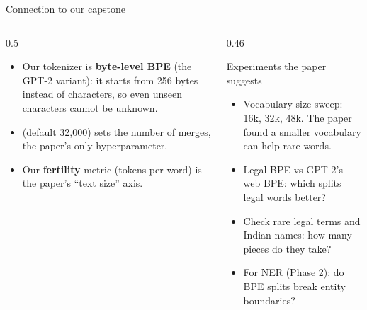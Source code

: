 \documentclass[aspectratio=169,11pt]{beamer}
\begin{document}
\begin{frame}{Connection to our capstone}
  \begin{columns}[T]
    \begin{column}{0.5\textwidth}
      \small
      \begin{itemize}
        \item Our tokenizer is \textbf{byte-level BPE} (the GPT-2 variant): it starts from 256 bytes instead of characters, so even unseen characters cannot be unknown.
        \item {} (default 32,000) sets the number of merges, the paper's only hyperparameter.
        \item Our \textbf{fertility} metric (tokens per word) is the paper's ``text size'' axis.
      \end{itemize}
    \end{column}
    \begin{column}{0.46\textwidth}
      \begin{exampleblock}{Experiments the paper suggests}
        \small
        \begin{itemize}
          \item Vocabulary size sweep: 16k, 32k, 48k. The paper found a smaller vocabulary can help rare words.
          \item Legal BPE vs GPT-2's web BPE: which splits legal words better?
          \item Check rare legal terms and Indian names: how many pieces do they take?
          \item For NER (Phase 2): do BPE splits break entity boundaries?
        \end{itemize}
      \end{exampleblock}
    \end{column}
  \end{columns}
\end{frame}
\end{document}
